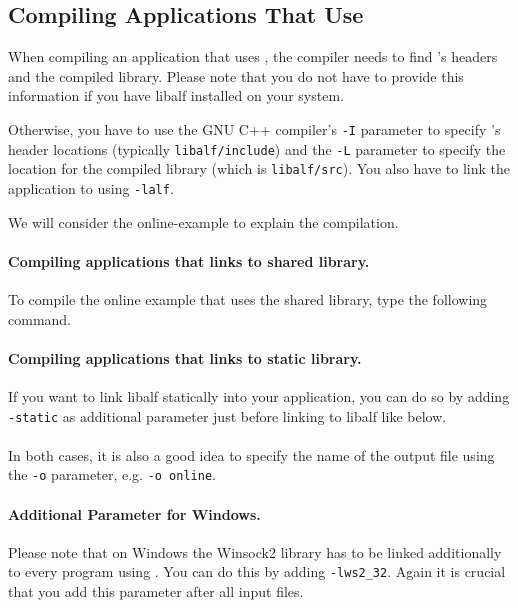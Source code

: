 \subsection{Compiling Applications That Use \libalf}
When compiling an application that uses \libalf, the compiler needs to find \libalf's headers and the compiled library. Please note that you do not have to provide this information if you have libalf installed on your system.

Otherwise, you have to use the GNU C++ compiler's \texttt{-I} parameter to specify \libalf's header locations (typically \texttt{libalf/include}) and the \texttt{-L} parameter to specify the location for the compiled library (which is \texttt{libalf/src}). You also have to link the application to \libalf using \texttt{-lalf}.

We will consider the online-example to explain the compilation.

\paragraph{Compiling applications that links to shared library.}
To compile the online example that uses the shared library, type the following command.


\paragraph{Compiling applications that links to static library.}
If you want to link libalf statically into your application, you can do so by adding \texttt{-static} as additional parameter just before linking to libalf like below.

\paragraph{}
In both cases, it is also a good idea to specify the name of the output file using the \texttt{-o} parameter, e.g. \texttt{-o online}.

\paragraph{Additional Parameter for Windows.}
Please note that on Windows the Winsock2 library has to be linked additionally to every program using \libalf. You can do this by adding \texttt{-lws2\_32}. Again it is crucial that you add this parameter after all input files.


